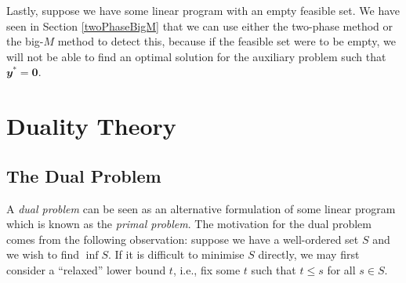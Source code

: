 \documentclass[math, code]{amznotes}
\theoremstyle{remark}
\begin{document}
Lastly, suppose we have some linear program with an empty feasible set. We have seen in Section \ref{twoPhaseBigM} that we can use either the two-phase method or the big-$M$ method to detect this, because if the feasible set were to be empty, we will not be able to find an optimal solution for the auxiliary problem such that $\mathbfit{y}^* = \mathbf{0}$.
\chapter{Duality Theory}
\section{The Dual Problem}
A \textit{dual problem} can be seen as an alternative formulation of some linear program which is known as the \textit{primal problem}. The motivation for the dual problem comes from the following observation: suppose we have a well-ordered set $S$ and we wish to find $\inf S$. If it is difficult to minimise $S$ directly, we may first consider a ``relaxed'' lower bound $t$, i.e., fix some $t$ such that $t \leq s$ for all $s \in S$.
\end{document}
